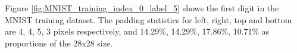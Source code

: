 




Figure \ref{fig:MNIST_training_index_0_label_5} shows the first digit in the MNIST training dataset. The padding statistics for left, right, top and bottom are 4, 4, 5, 3 pixels respectively, and 14.29\%, 14.29\%, 17.86\%, 10.71\% as proportions of the 28x28 size.



